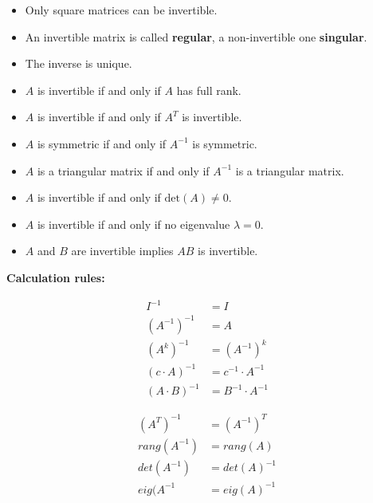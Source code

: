 \documentclass[8pt, a4paper, landscape, includeheadfoot]{extarticle}
\begin{document}
\begin{multicols*}{4}
	\begin{itemize}[leftmargin=0.29cm, itemsep=0pt]
		\item Only square matrices can be invertible.
		\item An invertible matrix is called \textbf{regular}, a non-invertible one \textbf{singular}.
		\item The inverse is unique.
		\item \( A \) is invertible if and only if \( A \) has full rank.
		\item \( A \) is invertible if and only if \( A^T \) is invertible.
		\item \( A \) is symmetric if and only if \( A^{-1} \) is symmetric.
		\item \( A \) is a triangular matrix if and only if \( A^{-1} \) is a triangular matrix.
		\item \( A \) is invertible if and only if \( \text{det}(A) \neq 0 \).
		\item \( A \) is invertible if and only if no eigenvalue \( \lambda = 0 \).
		\item \( A \) and \( B \) are invertible implies \( AB \) is invertible.
	\end{itemize}

	\textbf{Calculation rules:}

	\vspace{-5mm}
	\begin{minipage}[t]{0.49 \columnwidth}
		\begin{align}
			I^{-1}          & = I\nonumber                    \\
			(A^{-1})^{-1}   & = A \nonumber                   \\
			(A^k)^{-1}      & = (A^{-1})^k \nonumber          \\
			(c\cdot A)^{-1} & = c^{-1} \cdot A^{-1} \nonumber \\
			(A\cdot B)^{-1} & = B^{-1} \cdot A^{-1} \nonumber
		\end{align}
	\end{minipage}
	\begin{minipage}[t]{0.49 \columnwidth}
		\begin{align}
			(A^T)^{-1}   & = (A^{-1})^T \nonumber  \\
			rang(A^{-1}) & = rang(A) \nonumber     \\
			det(A^{-1})  & = det(A)^{-1} \nonumber \\
			eig(A^{-1}   & = eig(A)^{-1} \nonumber
		\end{align}
	\end{minipage}


\end{multicols*}
\end{document}
